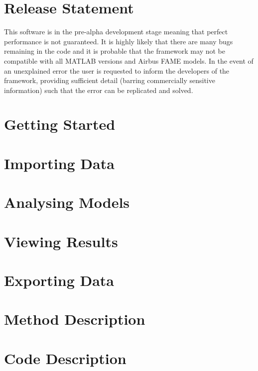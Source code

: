 \documentclass[10pt,a4paper]{article}
\begin{document}
\section*{Release Statement}
This software is in the pre-alpha development stage meaning that perfect performance is not guaranteed. It is highly likely that there are many bugs remaining in the code and it is probable that the framework may not be compatible with all MATLAB versions and Airbus FAME models. In the event of an unexplained error the user is requested to inform the developers of the framework, providing sufficient detail (barring commercially sensitive information) such that the error can be replicated and solved.

\newpage
\tableofcontents



\section*{Getting Started}

\section*{Importing Data}

\section*{Analysing Models}

\section*{Viewing Results}

\section*{Exporting Data}

\section*{Method Description}

\section*{Code Description}




\end{document}
